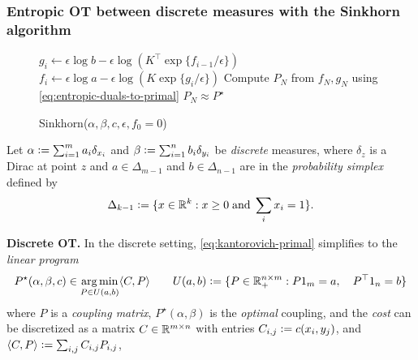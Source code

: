 \documentclass{article}
\newcommand{\defeq}{\vcentcolon=}
\begin{document}
\subsubsection{Entropic OT between discrete measures with the Sinkhorn algorithm}
\label{sec:prelim:discrete}

\begin{figure}
  \vspace{-11mm}
  \begin{minipage}{0.5\textwidth}
    \begin{algorithm}[H]
      \caption{\footnotesize Sinkhorn($\alpha, \beta, c, \epsilon, f_0=0$)}
      \begin{algorithmic}
        \footnotesize
        \State $g_{i} \leftarrow \epsilon \log b - \epsilon\log\left(
          K^\top \exp\{f_{i-1}/\epsilon\}\right)$
        \State $f_{i} \leftarrow \epsilon \log a - \epsilon\log\left(
          K \exp\{g_i/\epsilon\}\right)$
        \EndFor
        \State Compute $P_N$ from $f_N,g_N$ using \cref{eq:entropic-duals-to-primal}
        \State\Return $P_N\approx P^\star$
      \end{algorithmic}
      \label{alg:sinkhorn}
    \end{algorithm}
  \end{minipage}
  \vspace{-6mm}
\end{figure}
Let $\alpha\defeq\sum_{i=1}^m a_i\delta_{x_i}$ and
$\beta\defeq\sum_{i=1}^n b_i\delta_{y_i}$
be
\emph{discrete} measures,
where $\delta_z$ is a Dirac at point $z$
and $a\in\Delta_{m-1}$ and $b\in\Delta_{n-1}$ are
in the \emph{probability simplex} defined by
\begin{equation}
  \label{eq:simplex}
  \Delta_{k-1}\defeq\{x\in \R^k : x\geq 0\; {\rm and}\; \sum_i x_i=1\}.
  \footnotesize
\end{equation}

\textbf{Discrete OT.}
In the discrete setting,
\cref{eq:kantorovich-primal} simplifies to the \emph{linear program}
\begin{equation}
  P^\star(\alpha,\beta,c)\in \argmin_{P\in U(a,b)} \langle C, P \rangle \qquad
  U(a, b)\defeq \{P\in\R_+^{n\times m} : P 1_m = a,\quad P^\top 1_n = b\}
  \label{eq:discrete-primal}
\end{equation}
where $P$ is a \emph{coupling matrix},
$P^\star(\alpha, \beta)$ is the \emph{optimal} coupling,
and the \emph{cost} can be discretized as a matrix $C\in\mathbb{R}^{m\times n}$ with entries
$C_{i,j}\defeq c(x_i, y_j)$, and
$\langle C, P\rangle \defeq \sum_{i,j}C_{i,j}P_{i,j}$,
\end{document}
